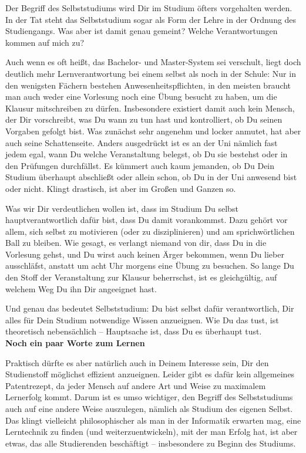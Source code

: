 {Der Begriff des Selbststudiums wird Dir im Studium öfters vorgehalten werden. In der Tat steht das Selbststudium sogar als Form der Lehre in der Ordnung des Studiengangs. Was aber ist damit genau gemeint? Welche Verantwortungen kommen auf mich zu?
}{Auch wenn es oft heißt, das Bachelor- und Master-System sei verschult, liegt doch deutlich mehr Lernverantwortung bei einem selbst als noch in der Schule: Nur in den wenigsten Fächern bestehen Anwesenheitspflichten, in den meisten braucht man auch weder eine Vorlesung noch eine Übung besucht zu haben, um die Klausur mitschreiben zu dürfen. Insbesondere existiert damit auch kein Mensch, der Dir vorschreibt, was Du wann zu tun hast und kontrolliert, ob Du seinen Vorgaben gefolgt bist.
    Was zunächst sehr angenehm und locker anmutet, hat aber auch seine Schattenseite. Anders ausgedrückt ist es an der Uni nämlich fast jedem egal, wann Du welche Veranstaltung belegst, ob Du sie bestehst oder in den Prüfungen durchfällst. Es kümmert auch kaum jemanden, ob Du Dein Studium überhaupt abschließt oder allein schon, ob Du in der Uni anwesend bist oder nicht. Klingt drastisch, ist aber im Großen und Ganzen so.

    Was wir Dir verdeutlichen wollen ist, dass im Studium Du selbst hauptverantwortlich dafür bist, dass Du damit vorankommst. Dazu gehört vor allem, sich selbst zu motivieren (oder zu disziplinieren) und am sprichwörtlichen Ball zu bleiben. Wie gesagt, es verlangt niemand von dir, dass Du in die Vorlesung gehst, und Du wirst auch keinen Ärger bekommen, wenn Du lieber ausschläfst, anstatt um acht Uhr morgens eine Übung zu besuchen. So lange Du den Stoff der Veranstaltung zur Klausur beherrschst, ist es gleichgültig, auf welchem Weg Du ihn Dir angeeignet hast.

    Und genau das bedeutet Selbststudium: Du bist selbst dafür verantwortlich, Dir alles für Dein Studium notwendige Wissen anzueignen. Wie Du das tust, ist theoretisch nebensächlich – Hauptsache ist, dass Du es überhaupt tust.\\

    \textbf{Noch ein paar Worte zum Lernen}

    Praktisch dürfte es aber natürlich auch in Deinem Interesse sein, Dir den Studienstoff möglichst effizient anzueignen. Leider gibt es dafür kein allgemeines Patentrezept, da jeder Mensch auf andere Art und Weise zu maximalem Lernerfolg kommt. Darum ist es umso wichtiger, den Begriff des Selbststudiums auch auf eine andere Weise auszulegen, nämlich als Studium des eigenen Selbst. Das klingt vielleicht philosophischer als man in der Informatik erwarten mag, eine Lerntechnik zu finden (und weiterzuentwickeln), mit der man Erfolg hat, ist aber etwas, das alle Studierenden beschäftigt – insbesondere zu Beginn des Studiums.

}
